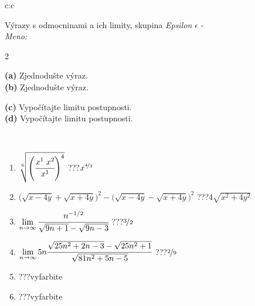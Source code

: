\documentclass[10pt]{report}
\begin{document}
\begin{tabular}{c:c}
\begin{minipage}[c][104.5mm][t]{0.5\linewidth}
\begin{center}
\vspace{7mm}
{\huge {\Large Výrazy s odmocninami a ich limity}, skupina \textit{Epsilon $\epsilon$} -}\\[5mm]
\textit{Meno:}\phantom{xxxxxxxxxxxxxxxxxxxxxxxxxxxxxxxxxxxxxxxxxxxxxxxxxxxxxxxxxxxxxxxxx}\\[5mm]
\begin{minipage}{0.95\linewidth}
\begin{center}
{\small \begin{multicols}{2} \raggedright
\phantom{xxxxxxxxx}\textbf{(a)} Zjednodušte výraz. \\[1mm]
\phantom{xxxxxxxxx}\textbf{(b)} Zjednodušte výraz. \par \columnbreak
\textbf{(c)} Vypočítajte limitu postupnosti. \\[1mm]
\textbf{(d)} Vypočítajte limitu postupnosti.
\end{multicols}
}
\end{center}
\end{minipage}
\\[4mm]
\begin{minipage}{0.79\linewidth}
\begin{center}
\begin{varwidth}{\linewidth}
\begin{enumerate}
\small
\item $\sqrt[6]{\left(\cfrac{x^{1}\;x^{2}}{x^{1}}\right)^{4}}$\quad \dotfill\; ???\;\dotfill \quad $x^{\nicefrac{4}{3}}$
\item {\footnotesize{\scriptsize$\big(\sqrt{x-4y}+\sqrt{x+4y}\big)^2-\big(\sqrt{x-4y}-\sqrt{x+4y}\big)^2$}\quad \dotfill\; ???\;\dotfill \quad $4\sqrt{x^2+4y^2}$}
\item $\lim\limits_{n\to\infty}\cfrac{n^{-1/2}}{\sqrt{9n+1}-\sqrt{9n-3}}$\quad \dotfill\; ???\;\dotfill \quad $\nicefrac{3}{2}$
\item $\lim\limits_{n\to\infty}5n\cfrac{\sqrt{25n^2+2n-3}-\sqrt{25n^2+1}}{\sqrt{81n^2+5n-5}}$\quad \dotfill\; ???\;\dotfill \quad $\nicefrac{2}{9}$
\item \quad \dotfill\; ???\;\dotfill \quad vyfarbite
\item \quad \dotfill\; ???\;\dotfill \quad vyfarbite
\end{enumerate}
\end{varwidth}
\end{center}

\end{minipage}
\end{center}
\end{minipage}
\end{tabular}
\end{document}
